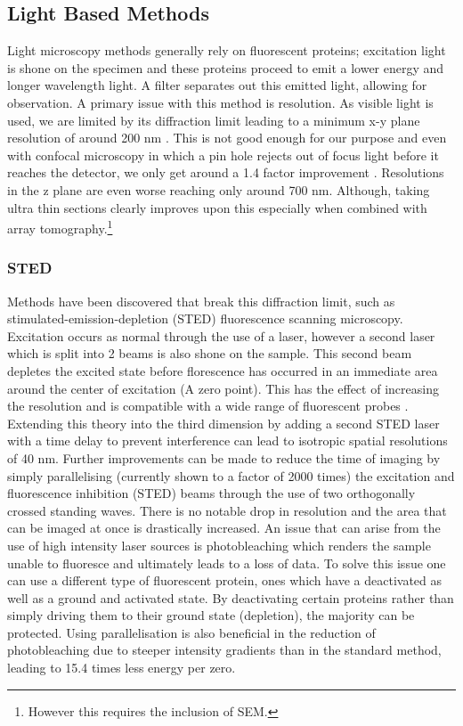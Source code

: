 \documentclass[a4paper, 11pt]{article}
\numberwithin{equation}{section}
\begin{document}
\subsection{Light Based Methods}
Light microscopy methods generally rely on fluorescent proteins; excitation light is shone on the specimen and these proteins proceed to emit a lower energy and longer wavelength light. A filter separates out this emitted light, allowing for observation. A primary issue with this method is resolution. As visible light is used, we are limited by its diffraction limit leading to a minimum x-y plane resolution of around 200 nm \cite{hell1994breaking}. This is not good enough for our purpose and even with confocal microscopy in which a pin hole rejects out of focus light before it reaches the detector, we only get around a 1.4 factor improvement \cite{lauterbach2012finding}. Resolutions in the z plane are even worse reaching only around 700 nm. Although, taking ultra thin sections clearly improves upon this especially when combined with array tomography.\footnote{However this requires the inclusion of SEM.} \cite{micheva2007array} \\
\subsubsection{STED}
Methods have been discovered that break this diffraction limit, such as stimulated-emission-depletion (STED) fluorescence scanning microscopy. Excitation occurs as normal through the use of a laser, however a second laser which is split into 2 beams is also shone on the sample. This second beam depletes the excited state before florescence has occurred in an immediate area around the center of excitation (A zero point). This has the effect of increasing the resolution \cite{hell1994breaking} and is compatible with a wide range of fluorescent probes \cite{dani2010new}. Extending this theory into the third dimension by adding a second STED laser with a time delay to prevent interference can lead to isotropic spatial resolutions of 40 nm. Further improvements can be made to reduce the time of imaging by simply parallelising (currently shown to a factor of 2000 times) the excitation and fluorescence inhibition (STED) beams\cite{bergermann20152000} through the use of two orthogonally crossed standing waves. There is no notable drop in resolution and the area that can be imaged at once is drastically increased. An issue that can arise from the use of high intensity laser sources is photobleaching which renders the sample unable to fluoresce and ultimately leads to a loss of data. To solve this issue one can use a different type of fluorescent protein, ones which have a deactivated as well as a ground and activated state. By deactivating certain proteins rather than simply driving them to their ground state (depletion), the majority can be protected\cite{strack2016imaging}. Using parallelisation is also beneficial in the reduction of photobleaching due to steeper intensity gradients than in the standard method, leading to 15.4 times less energy per zero\cite{bergermann20152000}.\\
\end{document}
